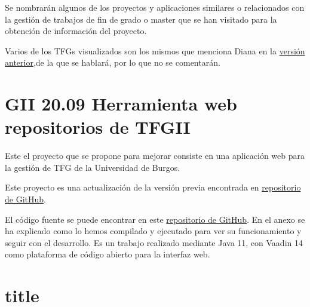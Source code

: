 Se nombrarán algunos de los proyectos y aplicaciones similares o relacionados con la gestión de trabajos de fin de grado o master que se han visitado para la obtención de información del proyecto.

Varios de los TFGs visualizados son los mismos que menciona Diana en la \href{https://github.com/dbo1001/Gestor-TFG-2021}{versión anterior},de la que se hablará, por lo que no se comentarán.  

\section{GII 20.09 Herramienta web repositorios de TFGII}
Este el proyecto que se propone para mejorar consiste en una aplicación web para la gestión de TFG de la Universidad de Burgos.

Este proyecto es una actualización de la versión previa encontrada en \href{https://github.com/jfb0019/Gestor-TFG-2016}{repositorio de GitHub}. 

El código fuente se puede encontrar en este \href{https://github.com/dbo1001/Gestor-TFG-2021}{repositorio de GitHub}. En el anexo se ha explicado como lo hemos compilado y ejecutado para ver su funcionamiento y seguir con el desarrollo. Es un trabajo realizado mediante Java 11, con Vaadin 14 como plataforma de código abierto para la interfaz web. 

\section{title}
